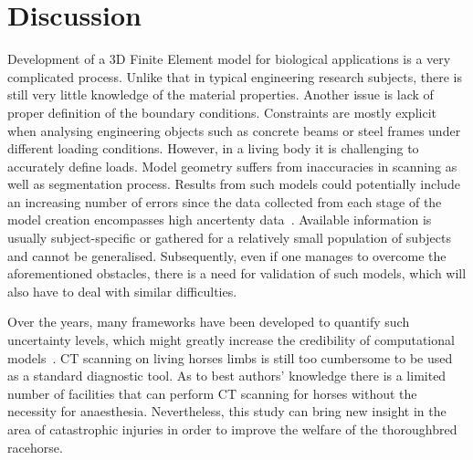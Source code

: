 \documentclass[review]{elsarticle}
\numberwithin{equation}{section}
\begin{document}

\section{Discussion}\label{sec:discussion}
Development of a 3D Finite Element model for biological applications is a very complicated process. 
Unlike that in typical engineering research subjects, there is still very little knowledge of the material properties. 
Another issue is lack of proper definition of the boundary conditions. Constraints are mostly explicit when analysing engineering objects such as concrete beams or steel frames under different loading conditions. 
However, in a living body it is challenging to accurately define loads. 
Model geometry suffers from inaccuracies in scanning as well as segmentation process. 
Results from such models could potentially include an increasing number of errors since the data collected from each stage of the 
model creation encompasses high ancertenty data~\citep{campoli2014effects}.
Available information is usually subject-specific or gathered for a relatively small population of subjects and cannot be generalised. 
Subsequently, even if one manages to overcome the aforementioned obstacles, there is a need for validation of such models, which will also have to deal with similar difficulties. 

Over the years, many frameworks have been developed to quantify such uncertainty levels, which might greatly increase the credibility of computational models~\citep{wille2016uncertainty}. 
CT scanning on living horses limbs is still too cumbersome to be used as a standard diagnostic tool.
As to best authors' knowledge there is a limited number of facilities that can perform CT scanning for horses without the necessity for anaesthesia. 
Nevertheless, this study can bring new insight in the area of catastrophic injuries in order to improve the welfare of the thoroughbred racehorse. %
\end{document}

